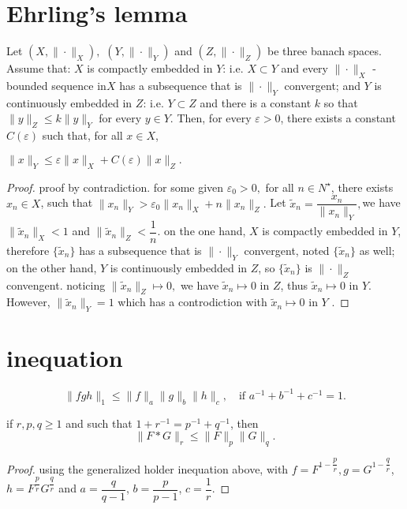 \section{Ehrling's lemma}
\begin{lemma}
	Let $(X,\|\cdot\|_X),$ $(Y,\|\cdot\|_Y)$ and $(Z,\|\cdot\|_Z)$ be three banach spaces. Assume that:
	$X$ is compactly embedded in $Y$: i.e. $X \subset Y$ and every $\|\cdot\|_X$ -bounded sequence in$ X$ has a subsequence that is $\|\cdot\|_Y$ convergent; and
	$Y$ is continuously embedded in $Z$: i.e. $Y \subset Z$ and there is a constant $k$ so that 
	$\|y\|_Z \leqslant k\|y\|_Y$ for every $y \in Y$.
	Then, for every $\varepsilon > 0$, there exists a constant $C(\varepsilon)$ such that, for all $x \in X$,
	
	${\displaystyle \|x\|_{Y}\leqslant \varepsilon \|x\|_{X}+C(\varepsilon )\|x\|_{Z}}.$
\end{lemma}
\begin{proof}
	proof by contradiction.
	for some given $\varepsilon_0 > 0,$ for all $n \in N^ \star$, there exists $x_n \in X$, such that
	${\displaystyle \|x_n\|_{Y} > \varepsilon_0 \|x_n\|_{X}+n\|x_n\|_{Z}}.$ Let $\tilde{x}_n=\dfrac{x_n}{\|x_n\|_Y},$we have $\|\tilde{x}_n\|_X < 1$ and $\|\tilde{x}_n\|_Z < \dfrac{1}{n}.$ on the one hand, 	$X$ is compactly embedded in $Y$, therefore $\{\tilde{x}_n\}$ has a subsequence that is $\|\cdot\|_Y$ convergent, noted $\{\tilde{x}_n\}$ as well; on the other hand, 	$Y$ is continuously embedded in $Z$, so $\{\tilde{x}_n\}$ is $\|\cdot\|_Z$ convengent. noticing $\|\tilde{x}_n\|_Z\mapsto0,$ we have $ \tilde{x}_n \mapsto 0 $ in $Z$, thus $ \tilde{x}_n \mapsto 0 $ in $Y$. However, $\|\tilde{x}_n\|_Y=1$ which has a controdiction with $ \tilde{x}_n \mapsto 0 $ in $Y$ .
\end{proof}

\section{inequation}
\begin{lemma}
	\begin{equation}
		\|fgh\|_1\leqslant \|f\|_a \|g\|_b \|h\|_c, \quad \text{if } a^{-1} +b^{-1} + c^{-1}=1.
	\end{equation}
\end{lemma}
\begin{lemma}
	if $r,p,q\geqslant1$ and such that $1+r^{-1} = p^{-1}+q^{-1}$, then
	\begin{equation}
		\|F*G\|_r\leqslant\|F\|_p\|G\|_q.
	\end{equation}
	\end{lemma}
\begin{proof}
	using the generalized holder inequation above, with $f=F^{1-\dfrac{p}{r}},g=G^{1-\dfrac{q}{r}}$, $h=F^{\dfrac{p}{r}}G^{\dfrac{q}{r}}$ and $a=\dfrac{q}{q-1}$, $b=\dfrac{p}{p-1}$, $c= \dfrac{1}{r}$.
\end{proof}



